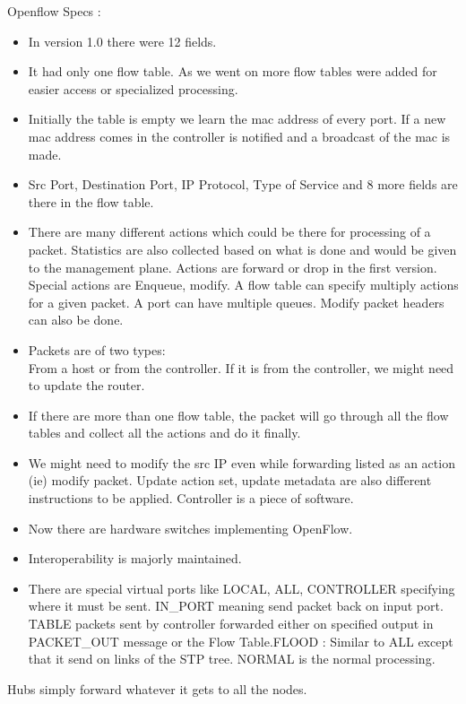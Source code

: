 \documentclass[solution,addpoints,12pt]{exam}
\begin{document}
Openflow Specs :\\
\begin{itemize}
\item In version 1.0 there were 12 fields.
\item It had only one flow table. As we went on more
flow tables were added for easier access or specialized
processing.
\item Initially the table is empty we learn the mac address
of every port. If a new mac address comes in the controller
is notified and a broadcast of the mac is made.
\item Src Port, Destination Port, IP Protocol, Type of Service
and 8 more fields are there in the flow table.
\item There are many different actions which could be there
for processing of a packet. Statistics are also collected based on what
is done and would be given to the management plane.
Actions are forward or drop in the first version.
Special actions are Enqueue, modify. A flow table can
specify multiply actions for a given packet. A port
can have multiple queues. Modify packet headers can also be
done.
\item Packets are of two types:\\
From a host or from the controller. If it is from the controller,
we might need to update the router.
\item If there are more than one flow table, the packet
will go through all the flow tables and collect all the actions
and do it finally.
\item We might need to modify the src IP even while forwarding
listed as an action (ie) modify packet. Update action
set, update metadata are also different instructions to be
applied. Controller is a piece of software.
\item Now there are hardware switches implementing OpenFlow.
\item Interoperability is majorly maintained.
\item There are special virtual ports like LOCAL, ALL, CONTROLLER
specifying where it must be sent. IN_PORT meaning send packet
back on input port. TABLE packets sent by controller
forwarded either on specified output in PACKET_OUT message or the
Flow Table.FLOOD : Similar to ALL except that it send on links of
the STP tree. NORMAL is the normal processing.
\end{itemize}

Hubs simply forward whatever it gets to all the nodes.
\end{document}

